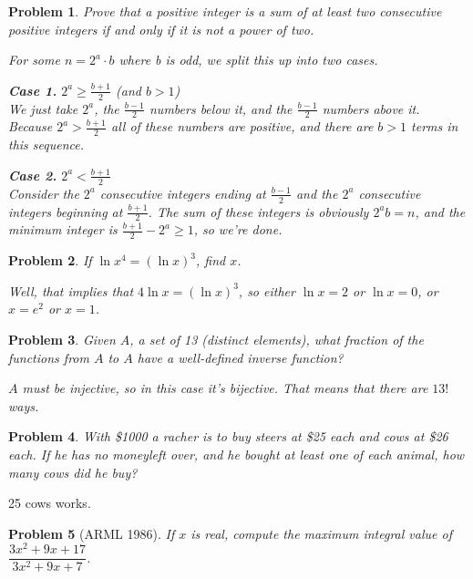 \documentclass[12pt]{scrartcl}
\newtheorem{a_problem}{Problem}
\begin{document}
\begin{a_problem}
	Prove that a positive integer is a sum of at least two consecutive positive integers if and only if it is not a power of two.
	\begin{soln}
		For some $n=2^a \cdot b$ where b is odd, we split this up into two cases. 

		\textbf{Case 1.} $2^a \geq \frac{b+1}{2} $ (and $b > 1$) \\
		We just take $2^a$, the $\frac{b-1}{2}$ numbers below it, and the $\frac{b-1}{2}$ numbers above it. Because $2^a > \frac{b+1}{2}$ all of these numbers are positive, and there are $b > 1$ terms in this sequence.

		\textbf{Case 2.} $2^a < \frac{b+1}{2} $ \\
		Consider the $2^a$ consecutive integers ending at $\frac{b-1}{2}$ and the $2^a$ consecutive integers beginning at $\frac{b+1}{2}$. The sum of these integers is obviously $2^{a}b = n$, and the minimum integer is $\frac{b+1}{2} - 2^a \geq 1$, so we're done.
	\end{soln}
\end{a_problem}
\setcounter{a_problem}{436}
\begin{a_problem}
	If $\ln x^4 = (\ln x)^3$, find $x$.
\begin{soln}
	Well, that implies that $4 \ln x = (\ln x)^3$, so either 
	$\ln x = 2$ or $\ln x = 0$, or $x = e^2$ or $x = 1$.
\end{soln}
\end{a_problem}
\begin{a_problem}
	Given $A$, a set of 13 (distinct elements), what fraction of 
	the functions from $A$ to $A$ have a well-defined inverse function?
	\begin{soln}
		$A$ must be injective, so in this case it's bijective. 
		That means that there are $13!$ ways.
	\end{soln}
\end{a_problem}
\begin{a_problem}
	With \$1000 a racher is to buy steers at \$25 each and cows at \$26 each.
	If he has no moneyleft over, and he bought at least one of each animal,
	how many cows did he buy?
\end{a_problem}
\begin{soln}
	25 cows works.
\end{soln}
\setcounter{a_problem}{440}
\begin{a_problem}[ARML 1986]
	If $x$ is real, compute the maximum integral value of 
	$\dfrac{3x^2+9x+17}{3x^2+9x+7}$.
\end{a_problem}
\end{document}
